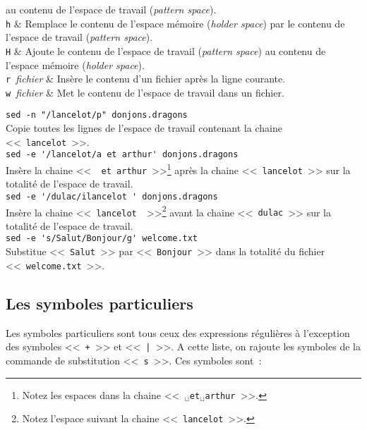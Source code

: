\begin{tabular}
			au contenu de l'espace de travail ({\sl pattern space}).\\[1ex]
		{\tt h}			&
			Remplace le contenu de l'espace m{\'e}moire ({\sl holder space})
			par le contenu de l'espace de travail ({\sl pattern space}).\\[1ex]
		{\tt H}			&
			Ajoute le contenu de l'espace de travail ({\sl pattern space})
			au contenu de l'espace m{\'e}moire ({\sl holder space}).	\\[1ex]
		\verb*=r ={\it fichier}	&
			Ins{\`e}re le contenu d'un fichier apr{\`e}s la ligne courante.	\\[1ex]
		\verb*=w ={\it fichier}	&
			Met le contenu de l'espace de travail dans un fichier.	\\
	\hline
\end{tabular}

\begin{example}
\verb*=sed -n "/lancelot/p" donjons.dragons=\\[0.5cm]
Copie toutes les lignes de l'espace de travail contenant la chaine
<<~{\tt lancelot}~>>.\\[0.5cm]

\verb*=sed -e '/lancelot/a et arthur' donjons.dragons=\\[0.5cm]
Ins{\`e}re la chaine <<~\verb*= et arthur=~>>\footnote{Notez les espaces
dans la chaine <<~{\tt $_\sqcup$et$_\sqcup$arthur}~>>.} apr{\`e}s la chaine
<<~{\tt lancelot}~>> sur la totalit{\'e} de l'espace de travail.\\[0.5cm]

\verb*=sed -e '/dulac/ilancelot ' donjons.dragons=\\[0.5cm]
Ins{\`e}re la chaine <<~\verb*=lancelot =~>>\footnote{Notez l'espace
suivant la chaine <<~{\tt lancelot}~>>.} avant la chaine <<~{\tt dulac}~>>
sur la totalit{\'e} de l'espace de travail.\\[0.5cm]

\verb*=sed -e 's/Salut/Bonjour/g' welcome.txt=\\[0.5cm]
Substitue <<~{\tt Salut}~>> par <<~{\tt Bonjour}~>> dans la totalit{\'e}
du fichier <<~{\tt welcome.txt}~>>.
\end{example}


\subsection{Les symboles particuliers}

Les symboles particuliers sont tous ceux des expressions r{\'e}guli{\`e}res {\`a}
l'exception des symboles <<~{\tt +}~>> et <<~{\tt |}~>>. A cette liste,
on rajoute les symboles de la commande de substitution <<~{\tt s}~>>.
Ces symboles sont~:

